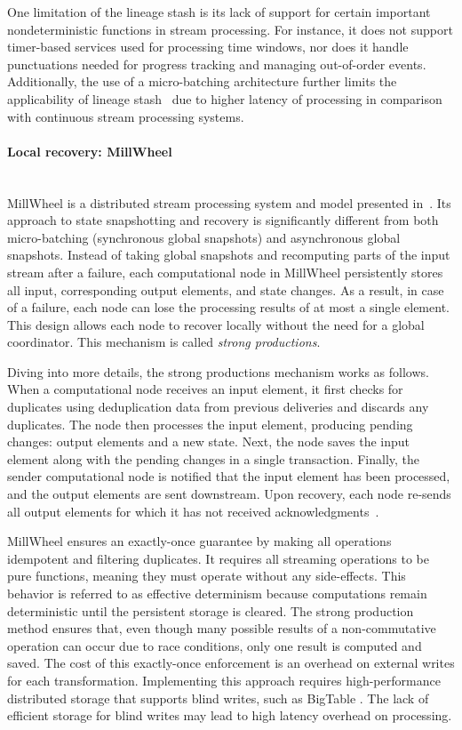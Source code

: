 One limitation of the lineage stash is its lack of support for certain important nondeterministic functions in stream processing. For instance, it does not support timer-based services used for processing time windows, nor does it handle punctuations needed for progress tracking and managing out-of-order events. Additionally, the use of a micro-batching architecture further limits the applicability of lineage stash~\cite{silvestre2021clonos} due to higher latency of processing in comparison with continuous stream processing systems.

\paragraph{Local recovery: MillWheel} \mbox{} \\

MillWheel is a distributed stream processing system and model presented in~\cite{Akidau:2013:MFS:2536222.2536229}. Its approach to state snapshotting and recovery is significantly different from both micro-batching (synchronous global snapshots) and asynchronous global snapshots. Instead of taking global snapshots and recomputing parts of the input stream after a failure, each computational node in MillWheel persistently stores all input, corresponding output elements, and state changes. As a result, in case of a failure, each node can lose the processing results of at most a single element. This design allows each node to recover locally without the need for a global coordinator. This mechanism is called {\em strong productions}.

Diving into more details, the strong productions mechanism works as follows. When a computational node receives an input element, it first checks for duplicates using deduplication data from previous deliveries and discards any duplicates. The node then processes the input element, producing pending changes: output elements and a new state. Next, the node saves the input element along with the pending changes in a single transaction. Finally, the sender computational node is notified that the input element has been processed, and the output elements are sent downstream. Upon recovery, each node re-sends all output elements for which it has not received acknowledgments~\cite{Akidau:2013:MFS:2536222.2536229}.

MillWheel ensures an exactly-once guarantee by making all operations idempotent and filtering duplicates. It requires all streaming operations to be pure functions, meaning they must operate without any side-effects. This behavior is referred to as effective determinism \cite{akidau2018streaming} because computations remain deterministic until the persistent storage is cleared. The strong production method ensures that, even though many possible results of a non-commutative operation can occur due to race conditions, only one result is computed and saved. The cost of this exactly-once enforcement is an overhead on external writes for each transformation. Implementing this approach requires high-performance distributed storage that supports blind writes, such as BigTable \cite{chang2008bigtable}. The lack of efficient storage for blind writes may lead to high latency overhead on processing.

